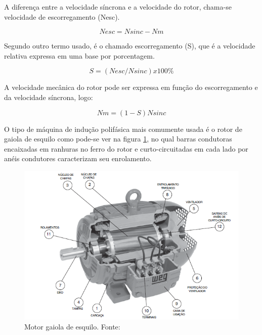 A diferença entre a velocidade síncrona e a velocidade do rotor, chama-se velocidade de escorregamento (Nesc). \cite{chapman}

    \begin{equation}\label{Velocidade de Escorregamento .}
            Nesc=Nsinc-Nm
    \end{equation}
    

Segundo \cite{chapman} outro termo usado, é o chamado escorregamento (S), que é a velocidade relativa expressa em uma base por porcentagem.
  
  
  \begin{equation}\label{Escorregamento S}
           S=(Nesc/Nsinc) x 100\%
    \end{equation}

A velocidade mecânica do rotor pode ser expressa em função do escorregamento e da velocidade síncrona, logo:


  \begin{equation}\label{Velocidade Mecânica do Rotor}
         Nm=(1-S)Nsinc
    \end{equation}

O tipo de máquina de indução polifásica mais comumente usada é o rotor de gaiola de esquilo como pode-se ver na figura \ref{fig:motor}, no qual barras condutoras encaixadas em ranhuras no ferro do rotor e curto-circuitadas em cada lado por anéis condutores caracterizam seu enrolamento. \cite{Fitzgerald}
\\
\begin{figure}[t]
\centering 
\includegraphics[keepaspectratio=true,scale=0.8]{figuras/motor.png}
\caption{Motor gaiola de esquilo. Fonte:\cite{WEG}}
\label{fig:motor}

\end{figure}

